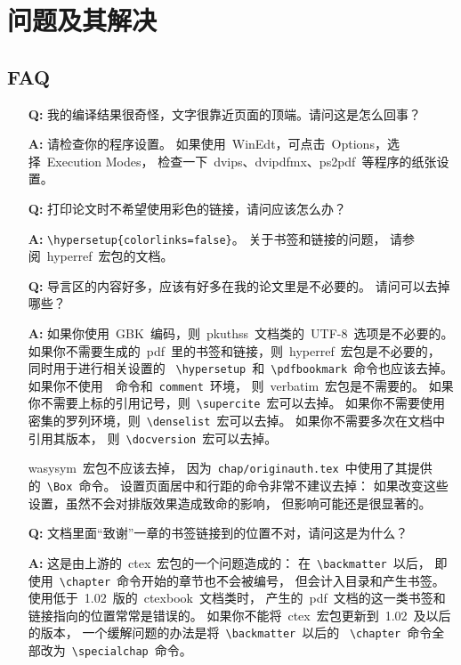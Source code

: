 \chapter{问题及其解决}
	\section{FAQ\label{sec:faq}}
	\begin{enumerate}
		\item[\textbf{Q:}]
		我的编译结果很奇怪，文字很靠近页面的顶端。请问这是怎么回事？

		\item[\textbf{A:}]
		请检查你的程序设置。
		如果使用~WinEdt，可点击~Options，选择~Execution Modes，
		检查一下~dvips、dvipdfmx、ps2pdf~等程序的纸张设置。

		\item[\textbf{Q:}]
		打印论文时不希望使用彩色的链接，请问应该怎么办？

		\item[\textbf{A:}]
		\verb|\hypersetup{colorlinks=false}|。
		关于书签和链接的问题，
		请参阅~hyperref~宏包的文档\supercite{hyperref-doc}。

		\item[\textbf{Q:}]
		导言区的内容好多，应该有好多在我的论文里是不必要的。
		请问可以去掉哪些？

		\item[\textbf{A:}]
		如果你使用~GBK~编码，则~pkuthss~文档类的~UTF-8~选项是不必要的。
		如果你不需要生成的~pdf~里的书签和链接，则~hyperref~宏包是不必要的，
		同时用于进行相关设置的~%
		\verb|\hypersetup|~和~\verb|\pdfbookmark|~命令也应该去掉。
		如果你不使用~\verb||~命令和~\verb|comment|~环境，
		则~verbatim~宏包是不需要的。
		如果你不需要上标的引用记号，则~\verb|\supercite|~宏可以去掉。
		如果你不需要使用密集的罗列环境，则~\verb|\denselist|~宏可以去掉。
		如果你不需要多次在文档中引用其版本，
		则~\verb|\docversion|~宏可以去掉。

		wasysym~宏包不应该去掉，
		因为~\verb|chap/originauth.tex|~中使用了其提供的~\verb|\Box|~命令。
		设置页面居中和行距的命令非常不建议去掉：
		如果改变这些设置，虽然不会对排版效果造成致命的影响，
		但影响可能还是很显著的。

		\item[\textbf{Q:}]
		文档里面“致谢”一章的书签链接到的位置不对，请问这是为什么？

		\item[\textbf{A:}]
		这是由上游的~ctex~宏包的一个问题造成的：
		在~\verb|\backmatter|~以后，
		即使用~\verb|\chapter|~命令开始的章节也不会被编号，
		但会计入目录和产生书签。
		使用低于~1.02~版的~ctexbook~文档类时，
		产生的~pdf~文档的这一类书签和链接指向的位置常常是错误的。
		如果你不能将~ctex~宏包更新到~1.02~及以后的版本，
		一个缓解问题的办法是将~\verb|\backmatter|~以后的~%
		\verb|\chapter|~命令全部改为~\verb|\specialchap|~命令。
	\end{enumerate}

